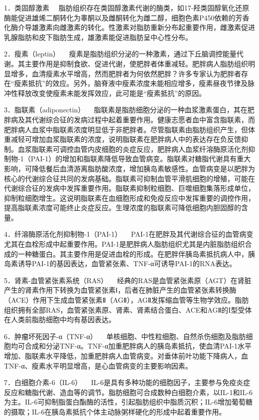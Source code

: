 {1．类固醇激素}
　脂肪组织存在类固醇激素代谢的酶类，如17-羟类固醇氧化还原酶能促进雄烯二酮转化为睾酮以及雌酮转化为雌二醇，细胞色素P450依赖的芳香化酶介导雄激素向雌激素的转化。性激素对脂肪重新分布起重要作用，雌激素促进乳腺脂肪和皮下脂肪生成，雄激素能促进脂肪呈中心性分布。

{2．瘦素（leptin）}
　瘦素是脂肪组织分泌的一种激素，通过下丘脑调控能量代谢。其主要作用是抑制食欲、促进代谢，使肥胖者体重减轻。肥胖病人脂肪组织明显增多，血清瘦素水平增高，然而肥胖者为何依然肥胖？许多专家认为肥胖者存在“瘦素抵抗”的效应。另外，脑脊液中瘦素浓度未能相应增多，瘦素昼夜节律及脉冲性释放改变使瘦素未能发挥效应，此可能是“瘦素抵抗”的原因。

{3．脂联素（adiponectin）}
　脂联素是脂肪细胞分泌的一种血浆激素蛋白，其在肥胖病及其代谢综合征的发病过程中起着重要作用。健康志愿者血中富含脂联素，而肥胖病人血浆中脂联素浓度明显低于非肥胖者。尽管脂联素由脂肪组织产生，但体重减轻可增加血浆脂联素的浓度，说明脂联素在肥胖病人中的表达存在负反馈抑制。血浆脂联素可调控血管内皮细胞的炎症反应，肥胖病人血浆纤溶酶原活化剂抑制物-1（PAI-1）的增加和脂联素降低导致血管病变。脂联素对糖脂代谢具有重大影响，可降低餐后血清游离脂肪酸浓度，增加胰岛素敏感性。血管病变是以肥胖为核心的代谢综合征共同的发病基础。脂联素可抑制血管平滑肌细胞的增殖，可能在代谢综合征的发病中发挥重要作用。脂联素抑制粒细胞、巨噬细胞集落形成单位，抑制粒细胞增生。这说明脂联素在血细胞形成和免疫反应中发挥重要的调控作用，提高脂联素浓度可能终止炎症反应。生理浓度的脂联素可降低细胞内胆固醇的含量。

{4．纤溶酶原活化剂抑制物-1（PAI-1）}
　PAI-1在肥胖及其代谢综合征的血管病变尤其在血栓形成中起重要作用。PAI-1是肥胖病人脂肪组织尤其是内脏脂肪组织合成的一种糖蛋白。其主要作用是促进血栓的形成。在肥胖伴胰岛素抵抗病人中，胰岛素诱导PAI-1的基因表达，血管紧张素、TNF-α可诱导PAI-1的RNA表达。

{5．肾素-血管紧张素系统（RAS）}
　经典的RAS是血管紧张素原（AGT）在肾脏产生的肾素作用下转换为血管紧张素Ⅰ，后者在肺脏产生的血管紧张素转换酶（ACE）作用下生成血管紧张素Ⅱ（AGⅡ），AGⅡ发挥缩血管等生物学效应。脂肪组织拥有全部RAS，血管紧张素原、肾素、肾素结合蛋白、ACE和AGⅡ的Ι型受体在人类前脂肪细胞中均有基因表达。

{6．肿瘤坏死因子-α（TNF-α）}
　单核细胞、中性粒细胞、自然杀伤细胞及脂肪细胞均可合成和分泌TNF-α。TNF-α加重肥胖病人的胰岛素抵抗，使血清PAI-1水平增加、脂联素水平降低，加重肥胖病人血管病变。对垂体前叶功能下降病人，血TNF-α、瘦素水平明显增高，是心血管病变的主要影响因素。

{7．白细胞介素-6（IL-6）}
　IL-6是具有多种功能的细胞因子，主要参与免疫炎症反应和糖脂代谢、造血等的调节。脂肪细胞可合成数种白细胞介素，以IL-1和IL-6为主。IL-6可抑制脂蛋白酯酶的活性，引起脂肪组织中脂质沉积；IL-6增加葡萄糖的摄取；IL-6在胰岛素抵抗个体主动脉粥样硬化的形成中起着重要作用。


